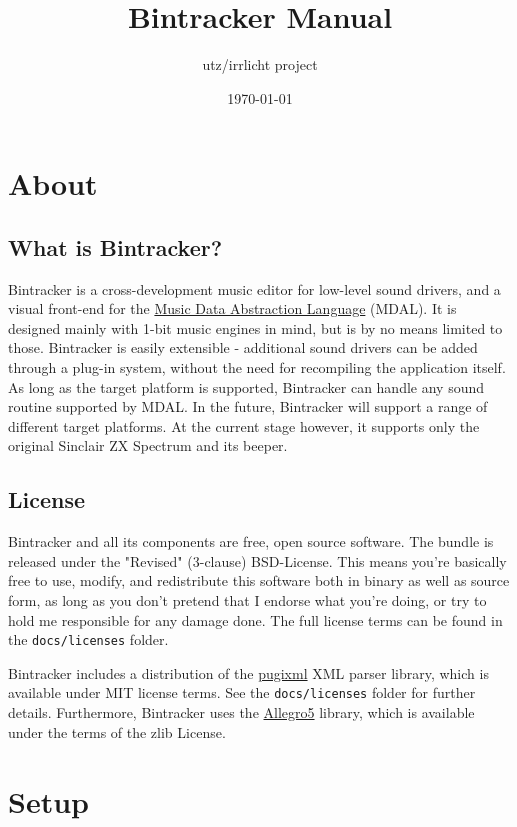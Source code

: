\documentclass[12pt]{report}	%
\begin{document}
\title{Bintracker Manual}
\author{utz/irrlicht project}
\date{\today}
\maketitle
{}
\tableofcontents

\chapter{About}

\section{What is Bintracker?}
Bintracker is a cross-development music editor for low-level sound drivers, and a visual front-end for the \href{https://utz82.github.io/MDAL/}{Music Data Abstraction Language} (MDAL). It is designed mainly with 1-bit music engines in mind, but is by no means limited to those. Bintracker is easily extensible - additional sound drivers can be added through a plug-in system, without the need for recompiling the application itself. As long as the target platform is supported, Bintracker can handle any sound routine supported by MDAL. In the future, Bintracker will support a range of different target platforms. At the current stage however, it supports only the original Sinclair ZX Spectrum and its beeper. 

\section{License}
Bintracker and all its components are free, open source software. The bundle is released under the "Revised" (3-clause) BSD-License. This means you're basically free to use, modify, and redistribute this software both in binary as well as source form, as long as you don't pretend that I endorse what you're doing, or try to hold me responsible for any damage done. The full license terms can be found in the \texttt{docs/licenses} folder.

Bintracker includes a distribution of the \href{https://pugixml.org/}{pugixml} XML parser library, which is available under MIT license terms. See the \texttt{docs/licenses} folder for further details. Furthermore, Bintracker uses the \href{http://liballeg.org/}{Allegro5} library, which is available under the terms of the zlib License.


\chapter{Setup}
\end{document}
